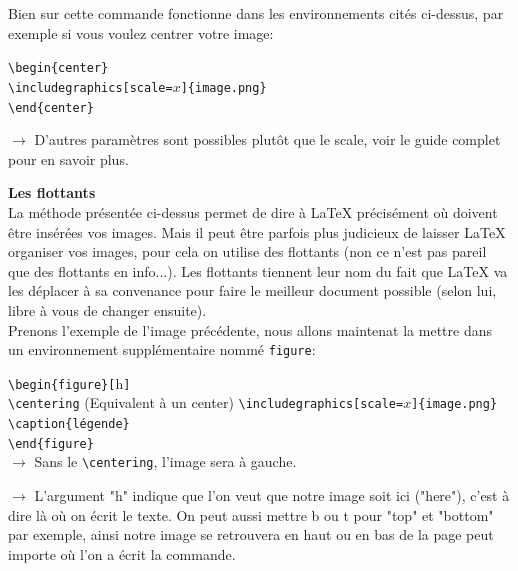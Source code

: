 \documentclass[11pt]{article}				%
\newcommand{\tb}{\textbackslash}
\newcommand{\cmdo}[3][]{\texttt{\textbackslash #2}\texttt{[#1}\texttt{]\{#3\}}}
\newcommand{\cmd}[2]{\texttt{\textbackslash #1}\texttt{\{#2\}}}
\begin{document}
Bien sur cette commande fonctionne dans les environnements cités ci-dessus, par exemple si vous voulez centrer votre image: \\


\begin{multicols}{2}
\cmd{begin}{center}\\
\cmdo[scale=$x$]{includegraphics}{image.png} \\
\cmd{end}{center}\\

\columnbreak

$\rightarrow$ D'autres paramètres sont possibles plutôt que le scale, voir le guide complet pour en savoir plus.
\end{multicols}


\textbf{Les flottants}\\

La méthode présentée ci-dessus permet de dire à LaTeX précisément où doivent être insérées vos images. Mais il peut être parfois plus judicieux de laisser LaTeX organiser vos images, pour cela on utilise des flottants (non ce n'est pas pareil que des flottants en info...). Les flottants tiennent leur nom du fait que LaTeX va les déplacer à sa convenance pour faire le meilleur document possible (selon lui, libre à vous de changer ensuite).\\



Prenons l'exemple de l'image précédente, nous allons maintenat la mettre dans un environnement supplémentaire nommé \texttt{figure}: \\

\begin{multicols}{2}
\cmd{begin}{figure}\texttt{[}h\texttt{]}\\
\texttt{\tb centering} \quad (Equivalent à un center)
\cmdo[scale=$x$]{includegraphics}{image.png} \\
\cmd{caption}{légende}\\
\cmd{end}{figure}\\
$\rightarrow$ Sans le \texttt{\tb centering}, l'image sera à gauche. 

\columnbreak

$\rightarrow$ L'argument "h" indique que l'on veut que notre image soit ici ("here"), c'est à dire là où on écrit le texte. On peut aussi mettre b ou t pour "top" et "bottom" par exemple, ainsi notre image se retrouvera en haut ou en bas de la page peut importe où l'on a écrit la commande.
\end{multicols}
\end{document}
